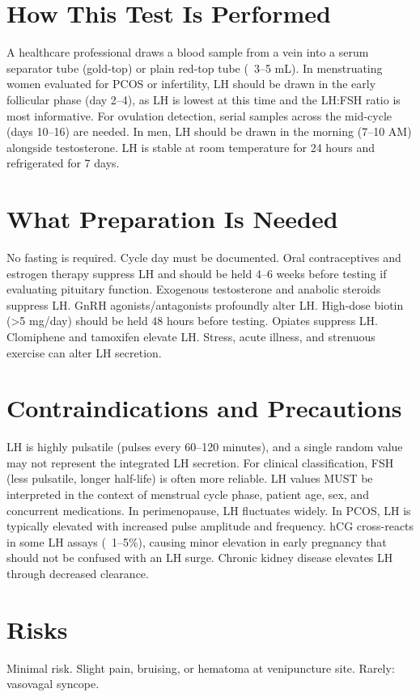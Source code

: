 \section*{How This Test Is Performed}
A healthcare professional draws a blood sample from a vein into a serum separator tube (gold-top) or plain red-top tube (~3--5 mL). In menstruating women evaluated for PCOS or infertility, LH should be drawn in the early follicular phase (day 2--4), as LH is lowest at this time and the LH:FSH ratio is most informative. For ovulation detection, serial samples across the mid-cycle (days 10--16) are needed. In men, LH should be drawn in the morning (7--10 AM) alongside testosterone. LH is stable at room temperature for 24 hours and refrigerated for 7 days.

\section*{What Preparation Is Needed}
No fasting is required. Cycle day must be documented. Oral contraceptives and estrogen therapy suppress LH and should be held 4--6 weeks before testing if evaluating pituitary function. Exogenous testosterone and anabolic steroids suppress LH. GnRH agonists/antagonists profoundly alter LH. High-dose biotin (>5 mg/day) should be held 48 hours before testing. Opiates suppress LH. Clomiphene and tamoxifen elevate LH. Stress, acute illness, and strenuous exercise can alter LH secretion.

\section*{Contraindications and Precautions}
LH is highly pulsatile (pulses every 60--120 minutes), and a single random value may not represent the integrated LH secretion. For clinical classification, FSH (less pulsatile, longer half-life) is often more reliable. LH values MUST be interpreted in the context of menstrual cycle phase, patient age, sex, and concurrent medications. In perimenopause, LH fluctuates widely. In PCOS, LH is typically elevated with increased pulse amplitude and frequency. hCG cross-reacts in some LH assays (~1--5\%), causing minor elevation in early pregnancy that should not be confused with an LH surge. Chronic kidney disease elevates LH through decreased clearance.

\section*{Risks}
Minimal risk. Slight pain, bruising, or hematoma at venipuncture site. Rarely: vasovagal syncope.

